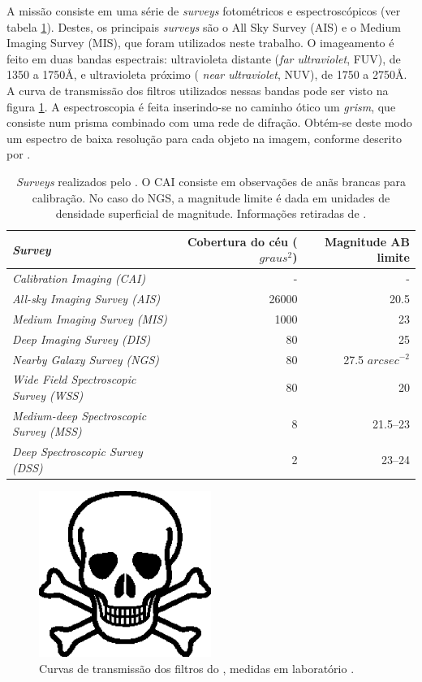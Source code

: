 A missão consiste em uma série de {\em surveys} fotométricos e espectroscópicos
(ver tabela \ref{tab:GalexSurveys}). Destes, os principais {\em surveys} são o
All Sky Survey (AIS) e o Medium Imaging Survey (MIS), que foram utilizados neste
trabalho. O imageamento é feito em duas bandas espectrais: ultravioleta distante
({\em far ultraviolet}, FUV), de 1350 a 1750\AA, e ultravioleta próximo ({\em
near ultraviolet}, NUV), de 1750 a 2750\AA. A curva de transmissão dos filtros
utilizados nessas bandas pode ser visto na figura \ref{fig:GalexFilters}. A
espectroscopia é feita inserindo-se no caminho ótico um {\em grism}, que
consiste num prisma combinado com uma rede de difração. Obtém-se deste modo um
espectro de baixa resolução para cada objeto na imagem, conforme descrito por
\cite{Morrissey2007}.

\begin{table}
	\caption[{\em Surveys} realizados pelo \galex.]{{\em Surveys} realizados pelo
	\galex. O CAI consiste em observações de anãs brancas para calibração. No caso
	do NGS, a magnitude limite é dada em unidades de densidade superficial de
	magnitude. Informações retiradas de \cite{Martin2005}.}
	\begin{tabular}{l r r}
		{\em Survey} & Cobertura do céu ($graus^2$) & Magnitude AB limite \\ 
		\midrule
		{\em Calibration Imaging (CAI)} & - & - \\
		{\em All-sky Imaging Survey (AIS)} & 26000 & 20.5 \\
		{\em Medium Imaging Survey (MIS)} & 1000 & 23 \\
		{\em Deep Imaging Survey (DIS)} & 80 & 25 \\
		{\em Nearby Galaxy Survey (NGS)} & 80 & 27.5 $arcsec^{-2}$  \\
		{\em Wide Field Spectroscopic Survey (WSS)} & 80 & 20 \\
		{\em Medium-deep Spectroscopic Survey (MSS)} & 8 & 21.5--23 \\
		{\em Deep Spectroscopic Survey (DSS)} & 2 & 23--24 \\
	\end{tabular}
	\label{tab:GalexSurveys}
\end{table}

\begin{figure}
	\includegraphics[width=0.5\textwidth]{figuras/test.eps}
	\caption[Curvas de transmissão dos filtros do \galex.]
	{Curvas de transmissão dos filtros do \galex, medidas em
	laboratório \citep{Morrissey2005}.}
	\label{fig:GalexFilters}
\end{figure}



